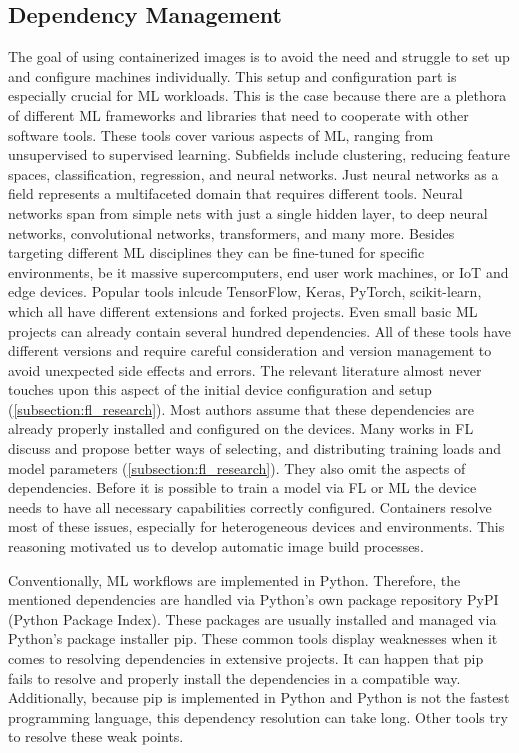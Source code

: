 \subsection{Dependency Management}

The goal of using containerized images is to avoid the need and struggle to set up and configure machines individually.
This setup and configuration part is especially crucial for ML workloads.
This is the case because there are a plethora of different ML frameworks and libraries that need to cooperate with other software tools.
These tools cover various aspects of ML, ranging from unsupervised to supervised learning.
Subfields include clustering, reducing feature spaces, classification, regression, and neural networks.
Just neural networks as a field represents a multifaceted domain that requires different tools.
Neural networks span from simple nets with just a single hidden layer, to deep neural networks, convolutional networks, transformers, and many more.
Besides targeting different ML disciplines they can be fine-tuned for specific environments, be it massive supercomputers, end user work machines, or IoT and edge devices.
Popular tools inlcude TensorFlow, Keras, PyTorch, scikit-learn, which all have different extensions and forked projects.
Even small basic ML projects can already contain several hundred dependencies.
All of these tools have different versions and require careful consideration and version management to avoid unexpected side effects and errors.
The relevant literature almost never touches upon this aspect of the initial device configuration and setup (\ref{subsection:fl_research}).
Most authors assume that these dependencies are already properly installed and configured on the devices.
Many works in FL discuss and propose better ways of selecting, and distributing training loads and model parameters (\ref{subsection:fl_research}).
They also omit the aspects of dependencies.
Before it is possible to train a model via FL or ML the device needs to have all necessary capabilities correctly configured.
Containers resolve most of these issues, especially for heterogeneous devices and environments.
This reasoning motivated us to develop automatic image build processes.

Conventionally, ML workflows are implemented in Python.
Therefore, the mentioned dependencies are handled via Python's own package repository PyPI (Python Package Index).
These packages are usually installed and managed via Python's package installer pip.
These common tools display weaknesses when it comes to resolving dependencies in extensive projects.
It can happen that pip fails to resolve and properly install the dependencies in a compatible way.
Additionally, because pip is implemented in Python and Python is not the fastest programming language, this dependency resolution can take long.
Other tools try to resolve these weak points.

